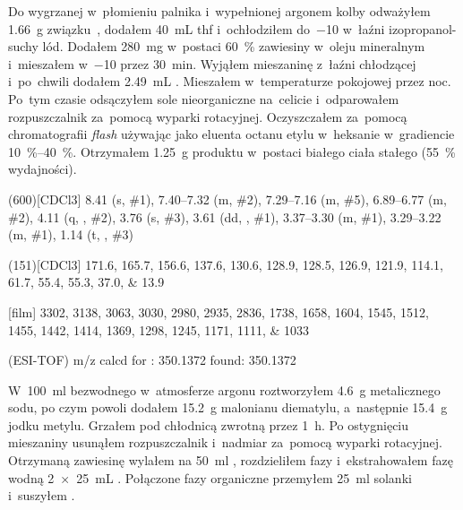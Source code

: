 Do wygrzanej w~płomieniu palnika i~wypełnionej argonem kolby odważyłem \SI{1.66}{\gram}
  związku~, dodałem \SI{40}{\mL} \gls{thf}
  i~ochłodziłem do~\SI{-10}{\degC} w~łaźni izopropanol-suchy lód.
Dodałem \SI{280}{\mg}  w~postaci \SI{60}{\percent} zawiesiny w~oleju mineralnym
  i~mieszałem w~\SI{-10}{\degC} przez \SI{30}{\minute}.
Wyjąłem mieszaninę z~łaźni chłodzącej i~po~chwili dodałem \SI{2.49}{\mL} .
Mieszałem w~temperaturze pokojowej przez noc.
Po~tym czasie odsączyłem sole nieorganiczne na~celicie i~odparowałem rozpuszczalnik za~pomocą
  wyparki rotacyjnej.
Oczyszczałem za~pomocą chromatografii \textit{flash} używając jako eluenta octanu etylu w~heksanie
  w~gradiencie \SIrange{10}{40}{\percent}.
Otrzymałem \SI{1.25}{\gram} produktu w~postaci białego ciała stałego (\SI{55}{\percent} wydajności).
\begin{fullexp}
  \NMR(600)[CDCl3] \num{8.41} (s, \#{1}), \numrange{7.40}{7.32} (m, \#{2}), \numrange{7.29}{7.16} (m, \#{5}), \numrange{6.89}{6.77} (m, \#{2}), \num{4.11} (q, , \#{2}), \num{3.76} (s, \#{3}), \num{3.61} (dd, , \#{1}), \numrange{3.37}{3.30} (m, \#{1}), \numrange{3.29}{3.22} (m, \#{1}), \num{1.14} (t, , \#{3})\par\noindent
  (151)[CDCl3] \numlist{171.6; 165.7; 156.6; 137.6; 130.6; 128.9; 128.5; 126.9; 121.9; 114.1; 61.7; 55.4; 55.3; 37.0; 13.9}\par\noindent
  [film] \numlist{3302; 3138; 3063; 3030; 2980; 2935; 2836; 1738; 1658; 1604; 1545; 1512; 1455; 1442; 1414; 1369; 1298; 1245; 1171; 1111; 1033}\par\noindent
   (ESI-TOF) m/z calcd for : \num{350.1372} found: \num{350.1372}
\end{fullexp}

W~\SI{100}{\ml} bezwodnego  w~atmosferze argonu roztworzyłem \SI{4.6}{\gram} metalicznego sodu,
  po czym powoli dodałem \SI{15.2}{\gram} malonianu diematylu, a~następnie \SI{15.4}{\gram} jodku metylu.
Grzałem pod chłodnicą zwrotną przez \SI{1}{\hour}.
Po ostygnięciu mieszaniny usunąłem rozpuszczalnik i~nadmiar  za~pomocą wyparki rotacyjnej.
Otrzymaną zawiesinę wylałem na \SI{50}{\ml} , rozdzieliłem fazy i~ekstrahowałem fazę wodną
  \SI[product-units = single]{2 x 25}{\mL} .
Połączone fazy organiczne przemyłem \SI{25}{\ml} solanki i~suszyłem .

